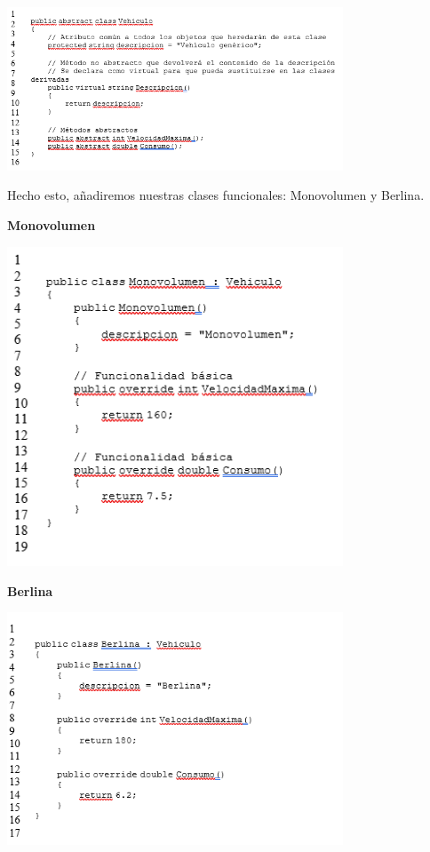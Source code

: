 \begin{flushleft}
\begin{center}
	\includegraphics[width=10cm]{./Imagenes/decorator3} 
	\end{center}

Hecho esto, añadiremos nuestras clases funcionales: Monovolumen y Berlina.

\textbf{Monovolumen}
\begin{center}
	\includegraphics[width=10cm]{./Imagenes/decorator4} 
	\end{center}


\textbf{Berlina}
\begin{center}
	\includegraphics[width=10cm]{./Imagenes/decorator5} 
	\end{center}


\end{flushleft}
